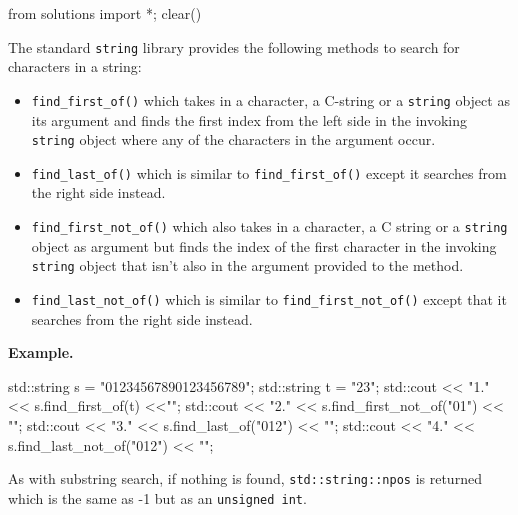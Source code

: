 \begin{python0}
from solutions import *; clear()
\end{python0}

The standard \texttt{string} library provides the following methods to
search for characters in a string:

\begin{itemize}
\item
  \verb!find_first_of()! which takes in a character, a C-string or a
  \texttt{string} object as its argument and finds the first index from
  the left side in the invoking \texttt{string} object where any of the
  characters in the argument occur.
\item
  \verb!find_last_of()! which is similar to \verb!find_first_of()!
  except it searches from the right side instead.
\item
  \verb!find_first_not_of()! which also takes in a character, a C
  string or a \texttt{string} object as argument but finds the index of
  the first character in the invoking \texttt{string} object that
  isn't also in the argument provided to the method.
\item
  \verb!find_last_not_of()! which is similar to
  \verb!find_first_not_of()! except that it searches from the right side instead.
\end{itemize}

\textbf{Example.}

\begin{console}
std::string s = "01234567890123456789";
std::string t = "23";
std::cout << "1." << s.find_first_of(t) <<"\n";
std::cout << "2." << s.find_first_not_of("01") << "\n";
std::cout << "3." << s.find_last_of("012") << "\n";
std::cout << "4." << s.find_last_not_of("012") << "\n";
\end{console}

As with substring search, if nothing is found, \texttt{std::string::npos}
is returned which is the same as -1 but as an \texttt{unsigned int}.

